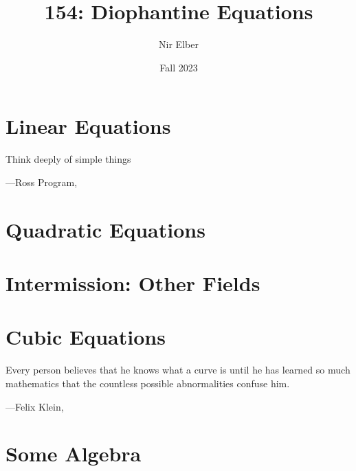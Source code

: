 \documentclass[openany]{book}
\title{154: Diophantine Equations}
\author{Nir Elber}
\date{Fall 2023}
\begin{document}
\maketitle

\nirtableofcontents

\newpage

\chapter{Linear Equations}

\epigraph{Think deeply of simple things}
{---Ross Program, \cite{ross-program}}






\chapter{Quadratic Equations}






\chapter{Intermission: Other Fields}






\chapter{Cubic Equations}

\epigraph{Every person believes that he knows what a curve is until he has learned so much mathematics that the countless possible abnormalities confuse him.}
{---Felix Klein, \cite{klein-elem-math-ii}}






\appendix

\chapter{Some Algebra}




\nirprintbib
\nirprintindex
\end{document}
